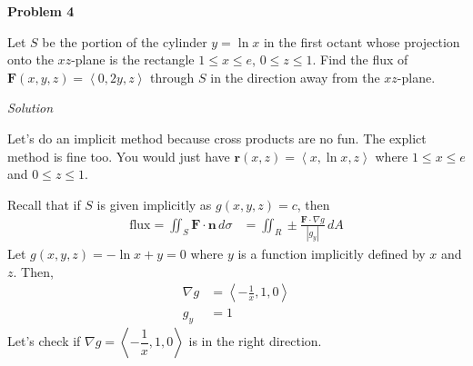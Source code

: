 \documentclass{article}
\newcommand{\lra}[1]{\left\langle #1 \right\rangle}
\renewcommand{\r}[0]{\mathbf{r}}
\newcommand{\F}[0]{\mathbf{F}}
\newcommand{\n}[0]{\mathbf{n}}
\newcommand{\Solution}{\textit{Solution}}
\begin{document}
\newpage
{}
{}\textbf{Problem 4}

Let $S$ be the portion of the cylinder $y=\ln x$ in the first octant whose projection onto the $xz$-plane is the rectangle $1\leq x\leq e$, $0\leq z\leq 1$. Find the flux of $\F(x,y,z)=\lra{0,2y,z}$ through $S$ in the direction away from the $xz$-plane.

\Solution

Let's do an implicit method because cross products are no fun. The explict method is fine too. You would just have $\r(x,z)=\lra{x,\ln x, z}$ where $1\leq x\leq e$ and $0\leq z \leq 1$.

Recall that if $S$ is given implicitly as $g(x,y,z)=c$, then
\begin{align*}
   \text{flux}= \iint_S \F\cdot \n \,d\sigma &= \iint_R \pm \frac{\F\cdot \nabla g}{\left|g_y\right|}\,dA
\end{align*}
Let $g(x,y,z)=-\ln x + y = 0$ where $y$ is a function implicitly defined by $x$ and $z$. Then,
\begin{align*}
    \nabla g &= \lra{-\frac{1}{x}, 1,0}\\
    g_y&=1
\end{align*}
Let's check if $\nabla g =\lra{-\dfrac{1}{x},1,0}$ is in the right direction.
\end{document}
